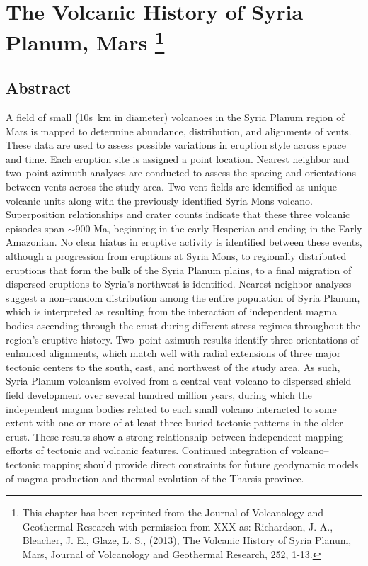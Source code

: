 \chapter[The Volcanic History of Syria Planum, Mars]{
The Volcanic History of Syria Planum, Mars \footnote{This chapter has been reprinted from the Journal of Volcanology and Geothermal Research with permission from XXX as: Richardson, J. A., Bleacher, J. E., Glaze, L. S., (2013), The Volcanic History of Syria Planum, Mars, Journal of Volcanology and Geothermal Research, 252, 1-13.}}\label{ch_syria}

\renewcommand*{\FigPath}{figures/chapter-syria_planum}

\section{Abstract}
A field of small (10s~km in diameter) volcanoes in the Syria Planum region of Mars is mapped to determine abundance, distribution, and alignments of vents.  These data are used to assess possible variations in eruption style across space and time. Each eruption site is assigned a point location. Nearest neighbor and two--point azimuth analyses are conducted to assess the spacing and orientations between vents across the study area. Two vent fields are identified as unique volcanic units along with the previously identified Syria Mons volcano.  Superposition relationships and crater counts indicate that these three volcanic episodes span $\sim$900 Ma, beginning in the early Hesperian and ending in the Early Amazonian. No clear hiatus in eruptive activity is identified between these events, although a progression from eruptions at Syria Mons, to regionally distributed eruptions that form the bulk of the Syria Planum plains, to a final migration of dispersed eruptions to Syria's northwest is identified. Nearest neighbor analyses suggest a non--random distribution among the entire population of Syria Planum, which is interpreted as resulting from the interaction of independent magma bodies ascending through the crust during different stress regimes throughout the region's eruptive history. Two--point azimuth results identify three orientations of enhanced alignments, which match well with radial extensions of three major tectonic centers to the south, east, and northwest of the study area. As such, Syria Planum volcanism evolved from a central vent volcano to dispersed shield field development over several hundred million years, during which the independent magma bodies related to each small volcano interacted to some extent with one or more of at least three buried tectonic patterns in the older crust.  These results show a strong relationship between independent mapping efforts of tectonic and volcanic features. Continued integration of volcano--tectonic mapping should provide direct constraints for future geodynamic models of magma production and thermal evolution of the Tharsis province.

